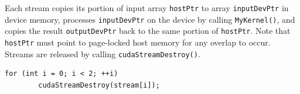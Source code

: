 	Each stream copies its portion of input array \texttt{hostPtr} to array \texttt{inputDevPtr} in device memory, processes \texttt{inputDevPtr} on the device by calling \texttt{MyKernel()}, and copies
	the result \texttt{outputDevPtr} back to the same portion of \texttt{hostPtr}. Note that \texttt{hostPtr} must point to page-locked host memory for any overlap to
	occur.\\
	Streams are released by calling \texttt{cudaStreamDestroy()}.
	\begin{lstlisting}[caption={CUDA Strams destroy}]
	for (int i = 0; i < 2; ++i)
		cudaStreamDestroy(stream[i]);
	\end{lstlisting}
	


	
